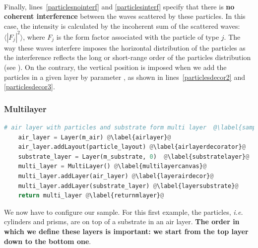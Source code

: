 \\


\noindent Finally, lines~\ref{particlesnointerf} and
\ref{particlesinterf} specify that there is \textbf{no coherent interference} between
the waves scattered by these particles. In this case, the intensity is calculated by
the incoherent sum of the scattered waves: $\langle |F_j|^2\rangle$,
where $F_j$ is the form factor associated with the particle of type $j$.  The way these waves
interfere imposes the horizontal distribution of
the particles as
the interference reflects the long or short-range order of the
particles distribution (see  ). On the contrary, the vertical position is
imposed when we add the particles in a given layer by parameter , as shown in lines~\ref{particlesdecor2} and \ref{particlesdecor3}.


%
\subsubsection{Multilayer}
\begin{lstlisting}[language=python, style=eclipseboxed,name=ex1,nolol]
# air layer with particles and substrate form multi layer  @\label{sampleassembling}@
    air_layer = Layer(m_air) @\label{airlayer}@
    air_layer.addLayout(particle_layout) @\label{airlayerdecorator}@
    substrate_layer = Layer(m_substrate, 0)  @\label{substratelayer}@
    multi_layer = MultiLayer() @\label{multilayercanvas}@
    multi_layer.addLayer(air_layer) @\label{layerairdecor}@
    multi_layer.addLayer(substrate_layer) @\label{layersubstrate}@
    return multi_layer @\label{returnmlayer}@
\end{lstlisting}
We now have to configure our sample. For this first example,
the particles, \textit{i.e.} cylinders and prisms, are on top of a substrate in an
air layer. \textbf{The order in which we define these layers is important: we
start from the top layer down to the bottom one}.

